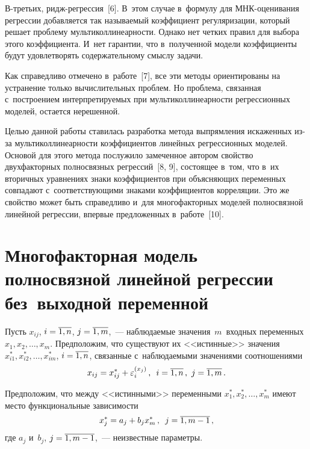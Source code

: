 \begin{multicols}{2}
  В-третьих, ридж-регрессия~[6]. В~этом случае в~формулу для  
МНК-оце\-ни\-ва\-ния регрессии до\-бав\-ля\-ет\-ся так называемый коэффициент 
регуляризации, который решает проблему мультиколлинеарности. Однако нет 
четких правил для выбора этого коэффициента. И~нет гарантии, что в~полученной 
модели коэффициенты будут удовлетворять содержательному смыслу задачи.
  
  Как справедливо отмечено в~работе~[7], все эти методы ориентированы на 
устранение только вычислительных проб\-лем. Но проблема, связанная 
с~построением интерпретируемых при мультиколлинеарности регрессионных 
моделей, остается нерешенной.
  
  Целью данной работы ставилась разработка метода выпрямления искаженных 
из-за мультиколлинеарности коэффициентов линейных регрессионных моделей. 
Основой для этого метода послужило замеченное автором свойство 
двухфакторных полносвязных регрессий~[8, 9], состоящее в~том, что в~их 
вторичных уравнениях знаки коэффициентов при объясняющих переменных 
совпадают с~соответствующими знаками коэффициентов корреляции. Это же 
свойство может быть справедливо и~для многофакторных моделей полносвязной 
линейной регрессии, впервые предложенных в~работе~[10].
  
\section{Многофакторная модель полносвязной линейной регрессии 
без~выходной переменной}

  Пусть $x_{ij}$, $i\hm=\overline{1,n}$, $j\hm=\overline{1,m}$,~--- наблюдаемые 
значения~$m$~входных переменных $x_1, x_2, \ldots , x_m$. Предположим, что 
существуют их <<истинные>> значения $x^*_{i1}, x^*_{i2},\ldots , x^*_{im}$, 
$i\hm=\overline{1,n}$, связанные с~наблюдаемыми значениями соотношениями
  \begin{equation}
  x_{ij}= x^*_{ij}+\varepsilon_i^{(x_j)}\,,\enskip i=\overline{1,n}\,,\ 
j=\overline{1,m}\,.
  \label{e1-baz}
  \end{equation}
  
  Предположим, что между <<истинными>> переменными $x_1^*, x_2^*, \ldots , 
x_m^*$ имеют место функциональные зависимости
  \begin{equation}
  x_j^*=a_j+b_jx_m^*\,,\enskip j=\overline{1,m-1}\,,
  \label{e2-baz}
  \end{equation}
где $a_j$ и~$b_j$, $j\hm=\overline{1,m-1}$,~--- неизвестные параметры.


\end{multicols}
